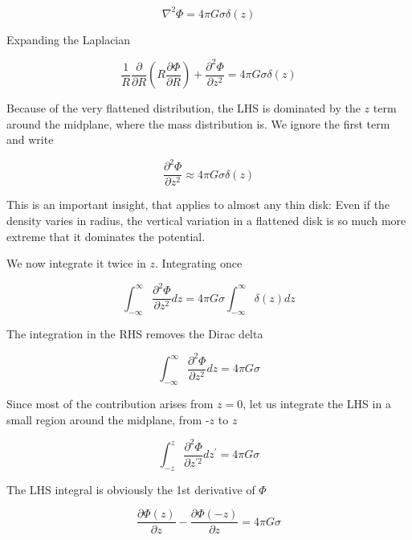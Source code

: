 \begin{equation}
\nabla^2 \varPhi  = 4\pi G \sigma \delta(z)
\end{equation}

Expanding the Laplacian 

\begin{equation}
\frac{1}{R}\frac{\partial}{\partial R} \left(R \frac{\partial\varPhi}{\partial R}\right) +  \frac{\partial^2\varPhi}{\partial z^2}  = 4\pi G \sigma \delta(z)
\end{equation}


Because of the very flattened distribution, the LHS is dominated by the $z$ term around the midplane, where the mass distribution is. We ignore the first term and write 

\begin{equation}
\frac{\partial^2\varPhi}{\partial z^2}  \approx 4\pi G \sigma \delta(z)
\end{equation}


This is an important insight, that applies to almost any thin disk: Even if the density varies in  radius, the vertical variation in a flattened disk is so much more extreme that it dominates the potential. 

We now integrate it twice in $z$. Integrating once  

\begin{equation}
\int_{-\infty}^{\infty} \frac{\partial^2 \varPhi}{\partial z^2} dz  = 4\pi G \sigma \int_{-\infty}^\infty  \delta(z) dz
\end{equation}


The integration in the RHS removes the Dirac delta 

\begin{equation}
\int_{-\infty}^{\infty} \frac{\partial^2 \varPhi}{\partial z^2} dz  = 4\pi G \sigma 
\end{equation}


Since most of the contribution arises from $z=0$, let us integrate the LHS in a small region around the midplane, from -$z$ to $z$

\begin{equation}
\int_{-z}^{z} \frac{\partial^2 \varPhi}{\partial z^{\prime 2}} dz^\prime  = 4\pi G \sigma 
\end{equation}

The LHS integral is obviously the 1st derivative of $\varPhi$ 

\begin{equation}
\frac{\partial \varPhi(z)}{\partial z} - \frac{\partial \varPhi(-z)}{\partial z}   = 4\pi G \sigma 
\end{equation}


